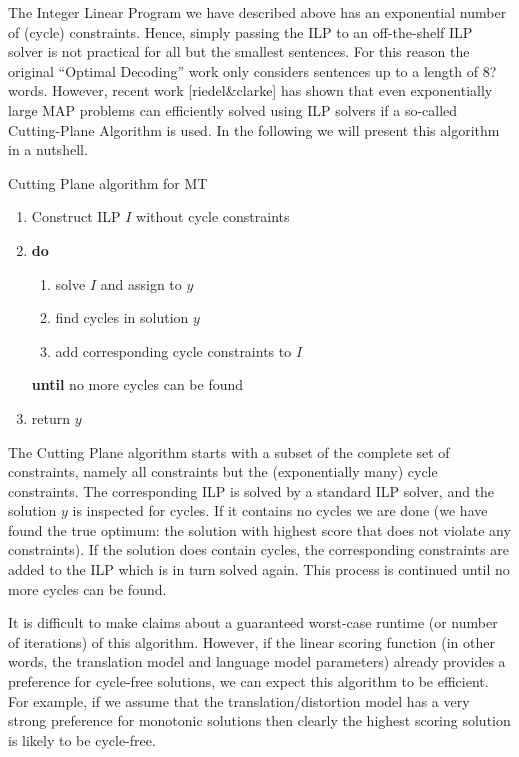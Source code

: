 The Integer Linear Program we have described above has an exponential
number of (cycle) constraints. Hence, simply passing the ILP to an
off-the-shelf ILP solver is not practical for all but the smallest
sentences. For this reason the original {}``Optimal Decoding'' work
only considers sentences up to a length of 8? words. However, recent
work {[}riedel\&clarke{]} has shown that even exponentially large
MAP problems can efficiently solved using ILP solvers if a so-called
Cutting-Plane Algorithm is used. In the following we will present
this algorithm in a nutshell.
\begin{algorithm}
Cutting Plane algorithm for MT
\begin{enumerate}
\item Construct ILP $I$ without cycle constraints
\item \textbf{do}

\begin{enumerate}
\item solve $I$ and assign to $y$
\item find cycles in solution $y$
\item add corresponding cycle constraints to $I$
\end{enumerate}
\textbf{until} no more cycles can be found

\item return $y$
\end{enumerate}
\end{algorithm}
The Cutting Plane algorithm starts with a subset of the complete set
of constraints, namely all constraints but the (exponentially many)
cycle constraints. The corresponding ILP is solved by a standard ILP
solver, and the solution $y$ is inspected for cycles. If it contains
no cycles we are done (we have found the true optimum: the solution
with highest score that does not violate any constraints). If the
solution does contain cycles, the corresponding constraints are added
to the ILP which is in turn solved again. This process is continued
until no more cycles can be found. 

It is difficult to make claims about a guaranteed worst-case runtime
(or number of iterations) of this algorithm. However, if the linear
scoring function (in other words, the translation model and language
model parameters) already provides a preference for cycle-free solutions,
we can expect this algorithm to be efficient. For example, if we assume
that the translation/distortion model has a very strong preference
for monotonic solutions then clearly the highest scoring solution
is likely to be cycle-free.
